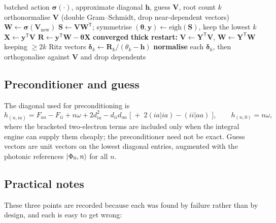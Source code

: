 \documentclass[11pt]{article}
\begin{document}
\begin{algorithm}[h]
\caption{Block Davidson--Liu for QED-CIS}
\begin{algorithmic}[1]
\Require batched action $\bm{\sigma}(\cdot)$, approximate diagonal $\bm{h}$, guess $\bm{V}$, root count $k$
\State orthonormalise $\bm{V}$ (double Gram--Schmidt, drop near-dependent vectors)
\Repeat
  \State $\bm{W} \gets \bm{\sigma}(\bm{V}_{\text{new}})$ 
  \State $\bm{S} \gets \bm{V}\bm{W}^{\mathsf{T}}$; symmetrise
  \State $(\bm{\theta}, \bm{y}) \gets \mathrm{eigh}(\bm{S})$, keep the lowest $k$
  \State $\bm{X} \gets \bm{y}^{\mathsf{T}}\bm{V}$ 
  \State $\bm{R} \gets \bm{y}^{\mathsf{T}}\bm{W} - \bm{\theta}\bm{X}$ 
   \textbf{converged} \EndIf
     \State \textbf{thick restart:} $\bm{V} \gets \bm{Y}^{\mathsf{T}}\bm{V}$, $\bm{W} \gets \bm{Y}^{\mathsf{T}}\bm{W}$ keeping $\ge 2k$ Ritz vectors
  \EndIf
  \State $\bm{\delta}_k \gets \bm{R}_k / (\theta_k - \bm{h})$ 
  \State \textbf{normalise} each $\bm{\delta}_k$, then orthogonalise against $\bm{V}$ and drop dependents
\end{algorithmic}
\end{algorithm}

\subsection{Preconditioner and guess}

The diagonal used for preconditioning is
\begin{equation}
h_{(n,ia)} = F_{aa} - F_{ii} + n\omega + 2d_{ia}^2 - d_{ii}d_{aa}
             \;\bigl[\;+\;2(ia|ia) - (ii|aa)\;\bigr],
\qquad
h_{(n,0)} = n\omega,
\label{eq:diag}
\end{equation}
where the bracketed two-electron terms are included only when the integral
engine can supply them cheaply; the preconditioner need not be exact. Guess
vectors are unit vectors on the lowest diagonal entries, augmented with the
photonic references $\ket{\Phi_0,n}$ for all $n$.

\subsection{Practical notes}

These three points are recorded because each was found by failure rather than by
design, and each is easy to get wrong:
\end{document}
